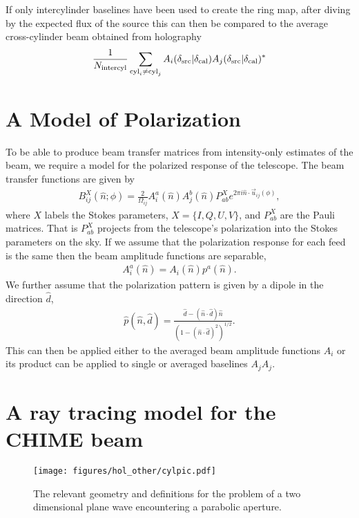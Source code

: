 If only intercylinder baselines have been used to create the ring map, after diving by the expected flux of the source this can then be compared to the average cross-cylinder beam obtained from holography
\begin{equation}
\frac{1}{N_{\rm intercyl}}\sum_{{\rm cyl}_i \ne{\rm cyl}_j}  A_i(\delta_{\rm src} | \delta_{\rm cal})A_j(\delta_{\rm src} | \delta_{\rm cal})^*
\end{equation}

\section{A Model of Polarization}
\label{app:hol:sec:polmodel}

To be able to produce beam transfer matrices from intensity-only estimates of the beam, we require a model for the polarized response of the telescope. The beam transfer functions are given by
\begin{align}
B^X_{ij}(\hat{n}; \phi) = \frac{2}{\Omega_{ij}} A^a_i(\hat{n}) A^b_j(\hat{n}) P_{ab}^X e^{2\pi i \hat{n}\cdot\vec{u}_{ij}(\phi)},
\end{align}
where $X$ labels the Stokes parameters, $X=\{I, Q, U, V\}$, and $P_{ab}^X$ are the Pauli matrices. That is $P_{ab}^X$ projects from the telescope's polarization into the Stokes parameters on the sky. If we assume that the polarization response for each feed is the same then the beam amplitude functions are separable,
\begin{align}
A^a_i(\hat{n}) = A_i(\hat{n})p^a(\hat{n}).
\end{align}
We further assume that the polarization pattern is given by a dipole in the direction $\hat{d}$,
\begin{align}
\hat{p}(\hat{n}, \hat{d}) =\frac{\hat{d} - (\hat{n}\cdot\hat{d}) \hat{n}}{(1 - (\hat{n}\cdot\hat{d})^2)^{1/2}}.
\end{align}
This can then be applied either to the averaged beam amplitude functions $A_i$  or its product can be applied to single or averaged baselines $A_jA_j$.

\section{A ray tracing model for the CHIME beam}
\label{app:hol:sec:model}

\begin{figure}[h!]
\begin{center}
\texttt{[image: figures/hol\_other/cylpic.pdf]}
\caption{The relevant geometry and definitions for the problem of a two dimensional plane wave encountering a parabolic aperture.}
\label{cylpic}
\end{center}
\end{figure}

